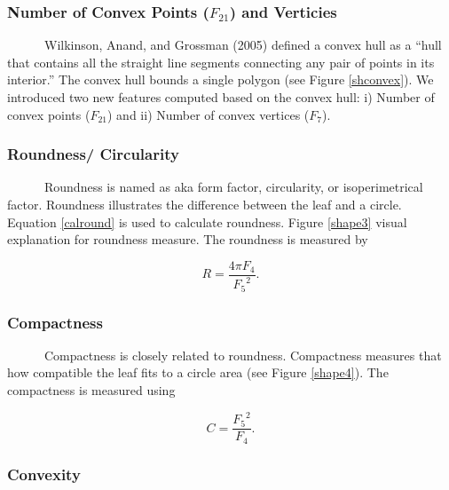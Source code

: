 \documentclass{article}
\begin{document}
\hypertarget{number-of-convex-points-f_21-and-verticies}{%
\subsubsection{\texorpdfstring{Number of Convex Points (\(F_{21}\)) and
Verticies}{Number of Convex Points (F\_\{21\}) and Verticies}}\label{number-of-convex-points-f_21-and-verticies}}

~~~~~~Wilkinson, Anand, and Grossman (2005) defined a convex hull as a
``hull that contains all the straight line segments connecting any pair
of points in its interior.'' The convex hull bounds a single polygon
(see Figure \ref{shconvex}). We introduced two new features computed
based on the convex hull: i) Number of convex points (\(F_{21}\)) and
ii) Number of convex vertices (\(F_7\)).

\hypertarget{roundness-circularity}{%
\subsubsection{Roundness/ Circularity}\label{roundness-circularity}}

~~~~~~Roundness is named as aka form factor, circularity, or
isoperimetrical factor. Roundness illustrates the difference between the
leaf and a circle. Equation \ref{calround} is used to calculate
roundness. Figure \ref{shape3} visual explanation for roundness measure.
The roundness is measured by

\begin{equation}
    R = \frac{4 \pi F_4}{{F_5}^2}.
\label{calround}
\end{equation}

\hypertarget{compactness}{%
\subsubsection{Compactness}\label{compactness}}

~~~~~~Compactness is closely related to roundness. Compactness measures
that how compatible the leaf fits to a circle area (see Figure
\ref{shape4}). The compactness is measured using

\begin{equation}
    C = \frac{{F_5}^2}{F_4}.
\label{calcompact}
\end{equation}

\hypertarget{convexity}{%
\subsubsection{Convexity}\label{convexity}}
\end{document}
